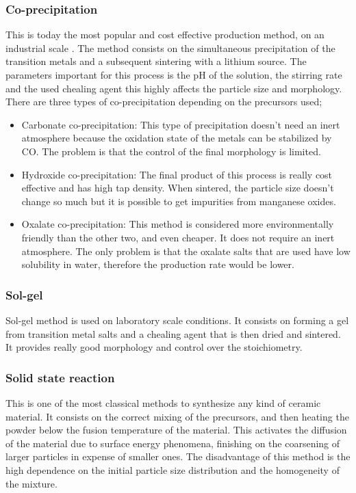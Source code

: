 \documentclass{article}
\begin{document}
{\subsubsection{Co-precipitation}
This is today the most popular and cost effective production method, on an industrial scale
. The method consists on the simultaneous precipitation of the transition metals and a subsequent sintering with
a lithium source. The parameters important for this process is the pH of the solution, the stirring rate 
and the used chealing agent this highly affects the particle size and morphology. \cite{process}  \\
There are three types of co-precipitation depending on the precursors used;
\begin{itemize}
  \item Carbonate co-precipitation: This type of precipitation doesn't need an inert atmosphere
  because the oxidation state of the metals can be stabilized by CO. The problem is that
the control of the final morphology is limited. \cite{process}
  \item Hydroxide co-precipitation: The final product of this process is really
  cost effective and has high tap density. When sintered, the particle size doesn't change
  so much but it is possible to get impurities from manganese oxides.\cite{process}
  \item Oxalate co-precipitation: This method is considered more environmentally
  friendly than the other two, and even cheaper. It does not require an inert 
  atmosphere. The only problem is that the oxalate salts that are used 
  have low solubility in water, therefore the production rate would be lower\cite{process}.
\end{itemize}

\subsubsection{Sol-gel}
Sol-gel method is used on laboratory scale conditions. It consists on forming a gel from transition 
metal salts and a chealing agent that is then dried and sintered. It provides really good morphology and control over the stoichiometry\cite{process}.

\subsubsection{Solid state reaction}
This is one of the most classical methods to synthesize any kind of ceramic material. 
It consists on the correct mixing of the precursors, and then heating the powder below the fusion temperature of the material.
This activates the diffusion of the material due to surface energy phenomena, finishing on the coarsening of larger particles
in expense of smaller ones. The disadvantage of this method is the high dependence on the initial particle size distribution and 
the homogeneity of the mixture\cite{process}.

}
\end{document}
